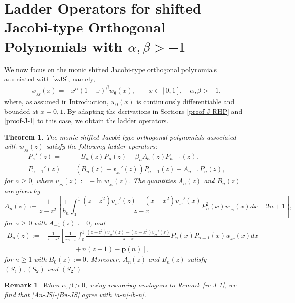 \documentclass[12pt,a4paper]{article}    %
\newtheorem{theorem}{Theorem}[section]
\newtheorem{remark}{Remark}
\numberwithin{equation}{section}
\begin{document}
\section{Ladder Operators for shifted Jacobi-type Orthogonal Polynomials with $\alpha,\beta>-1$}
We now focus on the monic shifted Jacobi-type orthogonal polynomials associated with \eqref{wJS}, namely,
\begin{align*}
w_{_{JS}}(x)=&x^{\alpha}(1-x)^{\beta}w_0(x),\qquad x\in[0,1],\quad\alpha,\beta>-1,
\end{align*}
where, as assumed in Introduction, $w_0(x)$ is continuously differentiable and bounded at $x=0,1$.
By adapting the derivations in Sections \ref{proof-J-RHP} and \ref{proof-J-1} to this case, we obtain the ladder operators.
\begin{theorem}\label{main-JS}
The monic shifted Jacobi-type orthogonal polynomials associated with $w_{_{JS}}(z)$ satisfy the following ladder operators:
\begin{align}
P_n'(z)=&-B_n(z)P_n(z)+\beta_nA_n(z)P_{n-1}(z),\label{loJS}\\
P_{n-1}'(z)=&\left(B_n(z)+v_{_{JS}}'(z)\right)P_{n-1}(z)-A_{n-1}P_n(z),\label{roJS}
\end{align}	
for $n\geq0$, where $v_{_{JS}}(z):=-\ln w_{_{JS}}(z)$. The quantities $A_n(z)$ and $B_n(z)$ are given by
\begin{equation}\label{An-JS}		 A_n(z):=\frac{1}{z-z^2}\left[\frac{1}{h_n}\int_{0}^{1}\frac{(z-z^2)v_{_{JS}}'(z)-(x-x^2)v_{_{JS}}'(x)}{z-x}P_n^2(x)w_{_{JS}}(x)dx+2n+1\right],
\end{equation}
for $n\geq0$ with $A_{-1}(z):=0$, and
\begin{equation}\label{Bn-JS}
\begin{aligned}		 B_n(z):=&\frac{1}{z-z^2}\left[\frac{1}{h_{n-1}}\int_{0}^{1}\frac{(z-z^2)v_{_{JS}}'(z)-(x-x^2)v_{_{JS}}'(x)}{z-x}P_n(x)P_{n-1}(x)w_{_{JS}}(x)dx\right.\\
&\left.\qquad\qquad+n(z-1)-\mathbf{p}(n)\right],
\end{aligned}
\end{equation}
for $n\geq1$ with $B_0(z):=0$.
Moreover, $A_n(z)$ and $B_n(z)$ satisfy $(S_1), (S_2)$ and $(S_2')$.
\end{theorem}

\begin{remark}
When $\alpha,\beta>0$, using reasoning analogous to Remark \ref{re-J-1}, we find that \eqref{An-JS}-\eqref{Bn-JS} agree with \eqref{a-n}-\eqref{b-n}.
\end{remark}	
\end{document}
